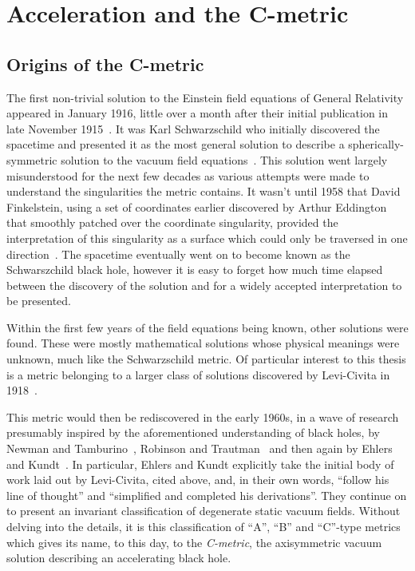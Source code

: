 \documentclass[
twoside,
openright,
frontopenright
]{dmathesis}
\begin{document}
\chapter{Acceleration and the C-metric}
\label{chap:cmet}

\section{Origins of the C-metric}
\label{sec:cmet-history}

The first non-trivial solution to the Einstein field equations of General
Relativity appeared in January 1916, little over a month after their initial
publication in late November 1915~\cite{Einstein:1915aa,Einstein:1916aa}. It was
Karl Schwarzschild who initially discovered the spacetime and presented it as
the most general solution to describe a spherically-symmetric solution to the
vacuum field equations~\cite{Schwarzschild:1916ab, Schwarzschild:1916aa,
  Schwarzschild:1916ea}. This solution went largely misunderstood for the next
few decades as various attempts were made to understand the singularities the
metric contains. It wasn't until 1958 that David Finkelstein, using a set of
coordinates earlier discovered by Arthur Eddington that smoothly patched over the
coordinate singularity, provided the interpretation of this singularity as a
surface which could only be traversed in one
direction~\cite{Finkelstein:1958aa}. The spacetime eventually went on to become
known as the Schwarszchild black hole, however it is easy to forget how much
time elapsed between the discovery of the solution and for a widely accepted
interpretation to be presented.

Within the first few years of the field equations being known, other solutions
were found. These were mostly mathematical solutions whose physical meanings
were unknown, much like the Schwarzschild metric. Of particular interest to this
thesis is a metric belonging to a larger class of solutions discovered by
Levi-Civita in 1918~\cite{Levi-Civita:1918aa}.

This metric would then be rediscovered in the early 1960s, in a wave of research
presumably inspired by the aforementioned understanding of black holes, by
Newman and Tamburino~\cite{Newman:1961aa}, Robinson and
Trautman~\cite{Robinson:1962zz} and then again by Ehlers and
Kundt~\cite{Ehlers:1962aa}. In particular, Ehlers and Kundt explicitly take the
initial body of work laid out by Levi-Civita, cited above, and, in their own
words, ``follow his line of thought'' and ``simplified and completed his
derivations''. They continue on to present an invariant classification of
degenerate static vacuum fields. Without delving into the details, it is this
classification of ``A'', ``B'' and ``C''-type metrics which gives its name, to
this day, to the \emph{C-metric}, the axisymmetric vacuum solution describing an
accelerating black hole.
\end{document}
